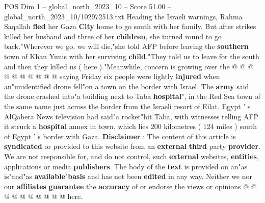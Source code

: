 \begin{textsample}{POS Dim 1 – global\_north\_2023\_10 – Score 51.00 – global\_north\_2023\_10/102972513.txt}
Heading the Israeli warnings, Rahma Saqallah \textbf{fled} her Gaza \textbf{City} home to go south with her family.
But after strikes killed her husband and three of her \textbf{children}, she turned round to go back."Wherever we go, we will die,"she told AFP before leaving the \textbf{southern} town of Khan Yunis with her surviving \textbf{child}."They told us to leave for the south and then they killed us ( here )."Meanwhile, concern is growing over the @ @ @ @ @ @ @ @ @ @ saying Friday six people were lightly \textbf{injured} when an"unidentified drone fell"on a town on the border with Israel.
The \textbf{army} said the drone crashed into"a building next to Taba \textbf{hospital}", in the Red Sea town of the same name just across the border from the Israeli resort of Eilat.
Egypt ' s AlQahera News television had said"a rocket"hit Taba, with witnesses telling AFP it struck a \textbf{hospital} annex in town, which lies 200 kilometres ( 124 miles ) south of Egypt ' s border with Gaza. \textbf{Disclaimer} : The content of this article is \textbf{syndicated} or provided to this website from an \textbf{external} \textbf{third} party \textbf{provider}.
We are not responsible for, and do not control, such \textbf{external} websites, \textbf{entities}, applications or media \textbf{publishers}.
The body of the \textbf{text} is provided on an"as is"and"as \textbf{available}"\textbf{basis} and has not been \textbf{edited} in any way.
Neither we nor our \textbf{affiliates} \textbf{guarantee} the \textbf{accuracy} of or endorse the views or opinions @ @ @ @ @ @ @ @ @ @ here.

\end{textsample}
